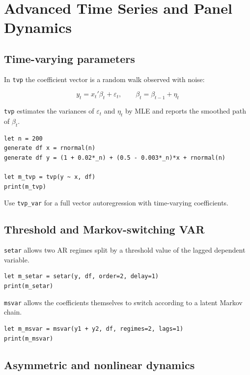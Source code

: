 \chapter{Advanced Time Series and Panel Dynamics}

\section{Time-varying parameters}

In \texttt{tvp} the coefficient vector is a random walk observed with noise:

\[
y_t = x_t'\beta_t + \varepsilon_t, \qquad
\beta_t = \beta_{t-1} + \eta_t
\]

\texttt{tvp} estimates the variances of $\varepsilon_t$ and $\eta_t$ by MLE and
reports the smoothed path of $\beta_t$.

\begin{lstlisting}[caption={Time-varying parameter regression}]
let n = 200
generate df x = rnormal(n)
generate df y = (1 + 0.02*_n) + (0.5 - 0.003*_n)*x + rnormal(n)

let m_tvp = tvp(y ~ x, df)
print(m_tvp)
\end{lstlisting}

Use \texttt{tvp\_var} for a full vector autoregression with time-varying
coefficients.

\section{Threshold and Markov-switching VAR}

\texttt{setar} allows two AR regimes split by a threshold value of the lagged
dependent variable.

\begin{lstlisting}[caption={SETAR}]
let m_setar = setar(y, df, order=2, delay=1)
print(m_setar)
\end{lstlisting}

\texttt{msvar} allows the coefficients themselves to switch according to a
latent Markov chain.

\begin{lstlisting}[caption={Markov-switching VAR}]
let m_msvar = msvar(y1 + y2, df, regimes=2, lags=1)
print(m_msvar)
\end{lstlisting}

\section{Asymmetric and nonlinear dynamics}

